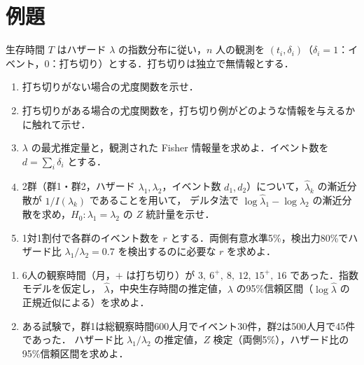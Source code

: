 \section{例題}\label{sec:m01-reidai}
\begin{reidai}\label{reidai:m01-1}
生存時間 $T$ はハザード $\lambda$ の指数分布に従い，$n$ 人の観測を $(t_i,\delta_i)$（$\delta_i=1$：イベント，$0$：打ち切り）とする．打ち切りは独立で無情報とする．
\begin{enumerate}[label=〔\arabic*〕]
\item 打ち切りがない場合の尤度関数を示せ．
\item 打ち切りがある場合の尤度関数を，打ち切り例がどのような情報を与えるかに触れて示せ．
\item $\lambda$ の最尤推定量と，観測された Fisher 情報量を求めよ．イベント数を $d=\sum_i\delta_i$ とする．
\item 2群（群1・群2，ハザード $\lambda_1,\lambda_2$，イベント数 $d_1,d_2$）について，$\hat\lambda_k$ の漸近分散が $1/I(\lambda_k)$ であることを用いて，
      デルタ法で $\log\hat\lambda_1-\log\hat\lambda_2$ の漸近分散を求め，$H_0:\lambda_1=\lambda_2$ の $Z$ 統計量を示せ．
\item 1対1割付で各群のイベント数を $r$ とする．両側有意水準5\%，検出力80\%でハザード比 $\lambda_1/\lambda_2=0.7$ を検出するのに必要な $r$ を求めよ．
\end{enumerate}
\end{reidai}

\begin{reidai}\label{reidai:m01-2}
\begin{enumerate}[label=〔\arabic*〕]
\item 6人の観察時間（月，$+$ は打ち切り）が $3,\ 6^+,\ 8,\ 12,\ 15^+,\ 16$ であった．指数モデルを仮定し，
      $\hat\lambda$，中央生存時間の推定値，$\lambda$ の95\%信頼区間（$\log\hat\lambda$ の正規近似による）を求めよ．
\item ある試験で，群1は総観察時間600人月でイベント30件，群2は500人月で45件であった．
      ハザード比 $\lambda_1/\lambda_2$ の推定値，$Z$ 検定（両側5\%），ハザード比の95\%信頼区間を求めよ．
\end{enumerate}
\end{reidai}

